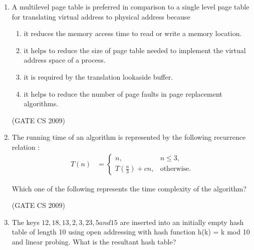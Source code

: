\documentclass[a4paper, 11pt]{article}
\begin{document}
\begin{enumerate}
    \item A multilevel page table is preferred in comparison to a single level page table for translating virtual address to physical address because
    \begin{enumerate} 
        \item  it reduces the memory access time to read or write a memory location.
        \item it helps to reduce the size of page table needed to implement the virtual address space of a process. 
        \item it is required by the translation lookaside buffer.
        \item it helps to reduce the number of page faults in page replacement algorithms.
    \end{enumerate}

    \hfill (GATE CS 2009)

    \item The running time of an algorithm is represented by the following recurrence relation :\\
    \begin{align}
        T(n) &=
    \begin{cases}
        n, & n \leq 3,\\
        T\!\left(\frac{n}{3}\right) + cn, & \text{otherwise}.
    \end{cases}
    \end{align}

    Which one of the following represents the time complexity of the algorithm?
    \begin{enumerate}
    \end{enumerate}

    \hfill (GATE CS 2009)

    \item  The keys $12, 18, 13, 2, 3, 23, 5 and 15$ are inserted into an initially empty hash table of length 10 using open addressing with hash function h(k) = k mod 10 and linear probing. What is the resultant hash table?
    \begin{enumerate}
        \begin{multicols}{4}
        

\end{multicols}
\end{enumerate}
\end{enumerate}
\end{document}
